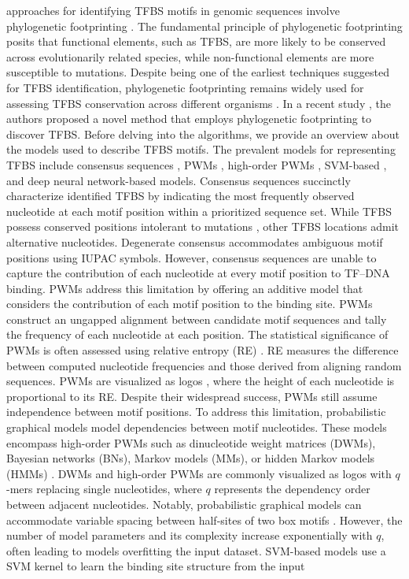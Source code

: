 \documentclass[a4paper, titlepage, openright]{book}
\begin{document}
approaches for identifying TFBS motifs in genomic sequences involve phylogenetic footprinting \citep{mccue2001phylogenetic,blanchette2002discovery}. The fundamental principle of phylogenetic footprinting posits that functional elements, such as TFBS, are more likely to be conserved across evolutionarily related species, while non-functional elements are more susceptible to mutations. Despite being one of the earliest techniques suggested for TFBS identification, phylogenetic footprinting remains widely used for assessing TFBS conservation across different organisms \citep{balazadeh2011ors1, xu2012cis,katara2012phylogenetic}. In a recent study \citep{glenwinkel2014targetortho}, the authors proposed a novel method that employs phylogenetic footprinting to discover TFBS. Before delving into the algorithms, we provide an overview about the models used to describe TFBS motifs. The prevalent models for representing TFBS include consensus sequences \citep{day1992critical}, PWMs \citep{stormo2000dna,stormo2013modeling}, high-order PWMs \citep{siddharthan2010dinucleotide,korhonen2017fast}, SVM-based \citep{gorkin2012integration}, and deep neural network-based \citep{he2021survey} models. Consensus sequences succinctly characterize identified TFBS by indicating the most frequently observed nucleotide at each motif position within a prioritized sequence set. While TFBS possess conserved positions intolerant to mutations \citep{li2015human}, other TFBS locations admit alternative nucleotides. Degenerate consensus accommodates ambiguous motif positions using IUPAC symbols. However, consensus sequences are unable to capture the contribution of each nucleotide at every motif position to TF–DNA binding. PWMs address this limitation by offering an additive model that considers the contribution of each motif position to the binding site. PWMs construct an ungapped alignment between candidate motif sequences and tally the frequency of each nucleotide at each position. The statistical significance of PWMs is often assessed using relative entropy (RE) \citep{stormo1998information}. RE measures the difference between computed nucleotide frequencies and those derived from aligning random sequences. PWMs are visualized as logos \citep{schneider1990sequence}, where the height of each nucleotide is proportional to its RE. Despite their widespread success, PWMs still assume independence between motif positions. To address this limitation, probabilistic graphical models model dependencies between motif nucleotides. These models encompass high-order PWMs such as dinucleotide weight matrices (DWMs), Bayesian networks (BNs), Markov models (MMs), or hidden Markov models (HMMs) \citep{siddharthan2010dinucleotide,korhonen2017fast,barash2003modeling,siebert2016bayesian}. DWMs and high-order PWMs are commonly visualized as logos with $q$-mers replacing single nucleotides, where $q$ represents the dependency order between adjacent nucleotides. Notably, probabilistic graphical models can accommodate variable spacing between half-sites of two box motifs \citep{mathelier2013next}. However, the number of model parameters and its complexity increase exponentially with $q$, often leading to models overfitting the input dataset. SVM-based models use a SVM kernel to learn the binding site structure from the input 
\end{document}
